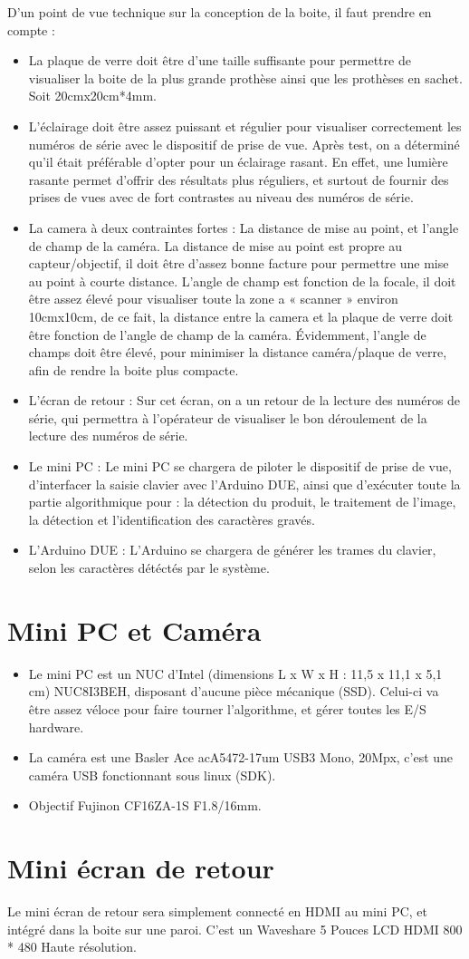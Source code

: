 D’un point de vue technique sur la conception de la boite, il faut prendre en compte :
\begin{itemize}
    \item La plaque de verre doit être d’une taille suffisante pour permettre de visualiser la boite de la plus grande prothèse ainsi que les prothèses en sachet. Soit 20cmx20cm*4mm.
    \item L’éclairage doit être assez puissant et régulier pour visualiser correctement les numéros de série avec le dispositif de prise de vue. Après test, on a déterminé qu’il était préférable d'opter pour un éclairage rasant. En effet, une lumière rasante permet d’offrir des résultats plus réguliers, et surtout de fournir des prises de vues avec de fort contrastes au niveau des numéros de série.
    \item La camera à deux contraintes fortes : La distance de mise au point, et l’angle de champ de la caméra.
    La distance de mise au point est propre au capteur/objectif, il doit être d’assez bonne facture pour permettre une mise au point à courte distance.
    L’angle de champ est fonction de la focale, il doit être assez élevé pour visualiser toute la zone a « scanner » environ 10cmx10cm, de ce fait, la distance entre la camera et la plaque de verre doit être fonction de l’angle de champ de la caméra. Évidemment, l’angle de champs doit être élevé, pour minimiser la distance caméra/plaque de verre, afin de rendre la boite plus compacte.
    \item L’écran de retour : Sur cet écran, on a un retour de la lecture des numéros de série, qui permettra à l’opérateur de visualiser le bon déroulement de la lecture des numéros de série.
    \item Le mini PC : Le mini PC se chargera de piloter le dispositif de prise de vue, d’interfacer la saisie clavier avec l'Arduino DUE, ainsi que d’exécuter toute la partie algorithmique pour : la détection du produit, le traitement de l’image, la détection et l’identification des caractères gravés.
    \item L'Arduino DUE : L'Arduino se chargera de générer les trames du clavier, selon les caractères détéctés par le système.
\end{itemize}


\section{Mini PC et Caméra}

\begin{itemize}
    \item Le mini PC est un NUC d’Intel (dimensions L x W x H : 11,5 x 11,1 x 5,1 cm) NUC8I3BEH, disposant d’aucune pièce mécanique (SSD). Celui-ci va être assez véloce pour faire tourner l’algorithme, et gérer toutes les E/S hardware.
    \item La caméra est une Basler Ace acA5472-17um USB3 Mono, 20Mpx, c’est une caméra USB fonctionnant sous linux (SDK).
    \item Objectif Fujinon CF16ZA-1S F1.8/16mm.
\end{itemize}

\section{Mini écran de retour}

Le mini écran de retour sera simplement connecté en HDMI au mini PC, et intégré dans la boite sur une paroi. C'est un Waveshare 5 Pouces LCD HDMI 800 * 480 Haute résolution.

